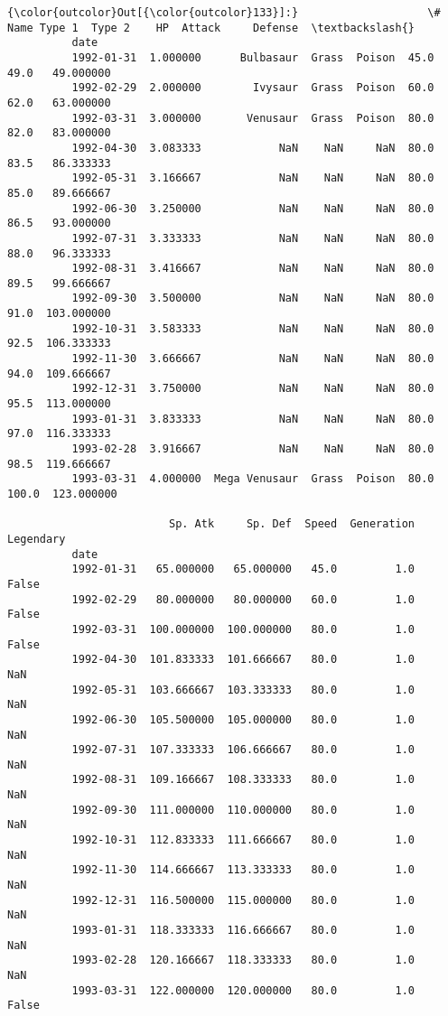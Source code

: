 \documentclass[11pt]{article}
\begin{document}
\begin{Verbatim}[commandchars=\\\{\}]
{\color{outcolor}Out[{\color{outcolor}133}]:}                    \#           Name Type 1  Type 2    HP  Attack     Defense  \textbackslash{}
          date                                                                           
          1992-01-31  1.000000      Bulbasaur  Grass  Poison  45.0    49.0   49.000000   
          1992-02-29  2.000000        Ivysaur  Grass  Poison  60.0    62.0   63.000000   
          1992-03-31  3.000000       Venusaur  Grass  Poison  80.0    82.0   83.000000   
          1992-04-30  3.083333            NaN    NaN     NaN  80.0    83.5   86.333333   
          1992-05-31  3.166667            NaN    NaN     NaN  80.0    85.0   89.666667   
          1992-06-30  3.250000            NaN    NaN     NaN  80.0    86.5   93.000000   
          1992-07-31  3.333333            NaN    NaN     NaN  80.0    88.0   96.333333   
          1992-08-31  3.416667            NaN    NaN     NaN  80.0    89.5   99.666667   
          1992-09-30  3.500000            NaN    NaN     NaN  80.0    91.0  103.000000   
          1992-10-31  3.583333            NaN    NaN     NaN  80.0    92.5  106.333333   
          1992-11-30  3.666667            NaN    NaN     NaN  80.0    94.0  109.666667   
          1992-12-31  3.750000            NaN    NaN     NaN  80.0    95.5  113.000000   
          1993-01-31  3.833333            NaN    NaN     NaN  80.0    97.0  116.333333   
          1993-02-28  3.916667            NaN    NaN     NaN  80.0    98.5  119.666667   
          1993-03-31  4.000000  Mega Venusaur  Grass  Poison  80.0   100.0  123.000000   
          
                         Sp. Atk     Sp. Def  Speed  Generation Legendary  
          date                                                             
          1992-01-31   65.000000   65.000000   45.0         1.0     False  
          1992-02-29   80.000000   80.000000   60.0         1.0     False  
          1992-03-31  100.000000  100.000000   80.0         1.0     False  
          1992-04-30  101.833333  101.666667   80.0         1.0       NaN  
          1992-05-31  103.666667  103.333333   80.0         1.0       NaN  
          1992-06-30  105.500000  105.000000   80.0         1.0       NaN  
          1992-07-31  107.333333  106.666667   80.0         1.0       NaN  
          1992-08-31  109.166667  108.333333   80.0         1.0       NaN  
          1992-09-30  111.000000  110.000000   80.0         1.0       NaN  
          1992-10-31  112.833333  111.666667   80.0         1.0       NaN  
          1992-11-30  114.666667  113.333333   80.0         1.0       NaN  
          1992-12-31  116.500000  115.000000   80.0         1.0       NaN  
          1993-01-31  118.333333  116.666667   80.0         1.0       NaN  
          1993-02-28  120.166667  118.333333   80.0         1.0       NaN  
          1993-03-31  122.000000  120.000000   80.0         1.0     False  
\end{Verbatim}
            
\end{document}
